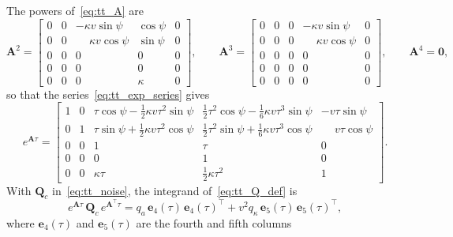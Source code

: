 The powers of~\eqref{eq:tt_A} are
\begin{equation}
    \renewcommand{\arraystretch}{1.3}
    \mathbf{A}^2 =
    \begin{bmatrix}
        0 & 0 & -\kappa v\sin\psi & \cos\psi & 0 \\
        0 & 0 & \phantom{-}\kappa v\cos\psi & \sin\psi & 0 \\
        0 & 0 & 0 & 0 & 0 \\
        0 & 0 & 0 & 0 & 0 \\
        0 & 0 & 0 & \kappa & 0
    \end{bmatrix},
    \qquad
    \mathbf{A}^3 =
    \begin{bmatrix}
        0 & 0 & 0 & -\kappa v\sin\psi & 0 \\
        0 & 0 & 0 & \phantom{-}\kappa v\cos\psi & 0 \\
        0 & 0 & 0 & 0 & 0 \\
        0 & 0 & 0 & 0 & 0 \\
        0 & 0 & 0 & 0 & 0
    \end{bmatrix},
    \qquad
    \mathbf{A}^4 = \mathbf{0},
\end{equation}
so that the series~\eqref{eq:tt_exp_series} gives
\begin{equation}
    \renewcommand{\arraystretch}{1.6}
    e^{\mathbf{A}\tau} =
    \begin{bmatrix}
        1 & 0 & \tau\cos\psi - \tfrac{1}{2}\kappa v\tau^2\sin\psi
          & \tfrac{1}{2}\tau^2\cos\psi - \tfrac{1}{6}\kappa v\tau^3\sin\psi & -v\tau\sin\psi \\
        0 & 1 & \tau\sin\psi + \tfrac{1}{2}\kappa v\tau^2\cos\psi
          & \tfrac{1}{2}\tau^2\sin\psi + \tfrac{1}{6}\kappa v\tau^3\cos\psi & \phantom{-}v\tau\cos\psi \\
        0 & 0 & 1 & \tau & 0 \\
        0 & 0 & 0 & 1 & 0 \\
        0 & 0 & \kappa\tau & \tfrac{1}{2}\kappa\tau^2 & 1
    \end{bmatrix}.
    \label{eq:app_exp}
\end{equation}
With $\mathbf{Q}_c$ in~\eqref{eq:tt_noise}, the integrand of~\eqref{eq:tt_Q_def} is
\begin{equation}
    e^{\mathbf{A}\tau}\,\mathbf{Q}_c\,e^{\mathbf{A}^\top\tau}
    = q_a\,\mathbf{e}_4(\tau)\,\mathbf{e}_4(\tau)^\top
    + v^2 q_\kappa\,\mathbf{e}_5(\tau)\,\mathbf{e}_5(\tau)^\top,
\end{equation}
where $\mathbf{e}_4(\tau)$ and $\mathbf{e}_5(\tau)$ are the fourth and fifth columns
